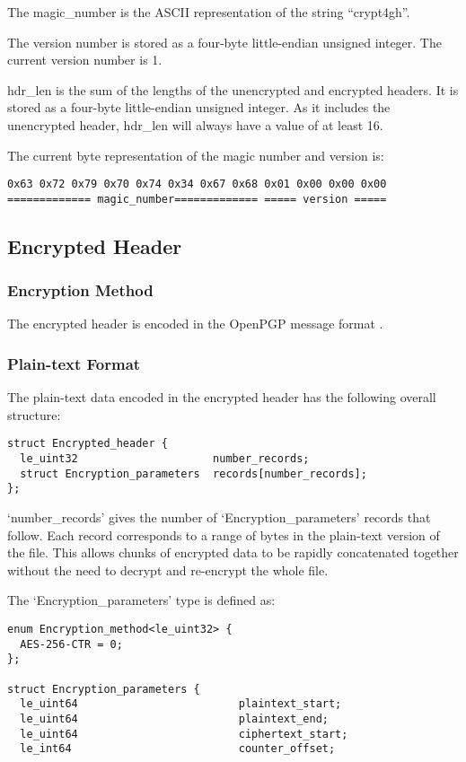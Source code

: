\documentclass[10pt]{article}
\begin{document}
{The magic\_number is the ASCII representation of the string ``crypt4gh''.

The version number is stored as a four-byte little-endian unsigned integer.
The current version number is 1.

hdr\_len is the sum of the lengths of the unencrypted and encrypted headers.
It is stored as a four-byte little-endian unsigned integer.
As it includes the unencrypted header, hdr\_len will always have a value of at least 16.

The current byte representation of the magic number and version is:
\begin{verbatim}
0x63 0x72 0x79 0x70 0x74 0x34 0x67 0x68 0x01 0x00 0x00 0x00
============= magic_number============= ===== version =====
\end{verbatim}

\subsection{Encrypted Header}
\subsubsection{Encryption Method}
The encrypted header is encoded in the OpenPGP message format \cite{RFC4880}.

\subsubsection{Plain-text Format}
The plain-text data encoded in the encrypted header has the following overall structure:
\begin{verbatim}
struct Encrypted_header {
  le_uint32                     number_records;
  struct Encryption_parameters  records[number_records];
};
\end{verbatim}

`number\_records' gives the number of `Encryption\_parameters' records that follow.
Each record corresponds to a range of bytes in the plain-text version of the file.
This allows chunks of encrypted data to be rapidly concatenated together without the need to decrypt and re-encrypt the
whole file.

The `Encryption\_parameters' type is defined as:

\begin{verbatim}
enum Encryption_method<le_uint32> {
  AES-256-CTR = 0;
};

struct Encryption_parameters {
  le_uint64                         plaintext_start;
  le_uint64                         plaintext_end;
  le_uint64                         ciphertext_start;
  le_int64                          counter_offset;


\end{verbatim}}
\end{document}
